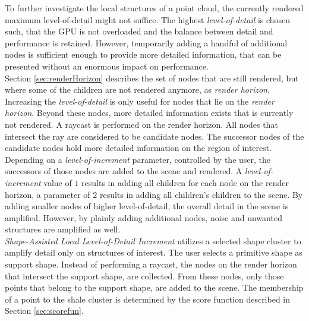 To further investigate the local structures of a point cloud, the currently rendered maximum level-of-detail might not suffice. The highest \textit{level-of-detail} is chosen such, that the GPU is not overloaded and the balance between detail and performance is retained. However, temporarily adding a handful of additional nodes is sufficient enough to provide more detailed information, that can be presented without an enormous impact on performance.
\\

Section \ref{sec:renderHorizon} describes the set of nodes that are still rendered, but where some of the children are not rendered anymore, as \textit{render horizon}. 
Increasing the \textit{level-of-detail} is only useful for nodes that lie on the \textit{render horizon}. Beyond these nodes, more detailed information exists that is currently not rendered. A raycast is performed on the render horizon. All nodes that intersect the ray are considered to be candidate nodes. The successor nodes of the candidate nodes hold more detailed information on the region of interest. Depending on a \textit{level-of-increment} parameter, controlled by the user, the successors of those nodes are added to the scene and rendered. A \textit{level-of-increment} value of $1$ results in adding all children for each node on the render horizon, a parameter of $2$ results in adding all children's children to the scene. 
By adding smaller nodes of higher level-of-detail, the overall detail in the scene is amplified. However, by plainly adding additional nodes, noise and unwanted structures are amplified as well. 
\\

\textit{Shape-Assisted Local Level-of-Detail Increment} utilizes a selected shape cluster to amplify detail only on structures of interest. The user selects a primitive shape as support shape. Instead of performing a raycast, the nodes on the render horizon that intersect the support shape, are collected. From these nodes, only those points that belong to the support shape, are added to the scene. The membership of a point to the shale cluster is determined by the score function described in Section \ref{sec:scorefun}. 

